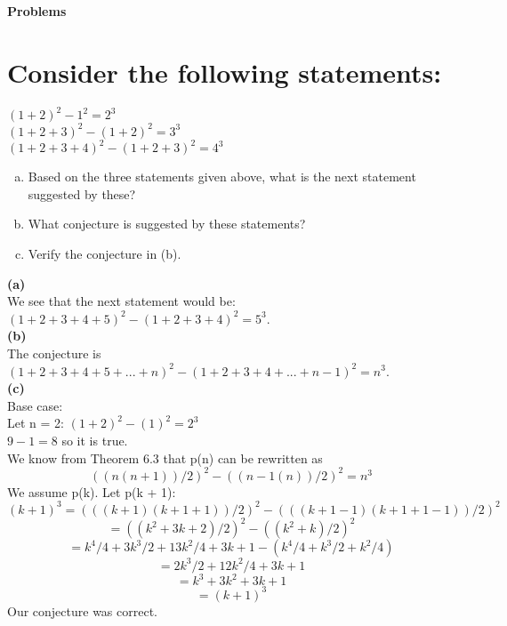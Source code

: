 \textbf{\Huge Problems}
\section{Consider the following statements:}
$(1+2)^2-1^2=2^3$\\
$(1+2+3)^2-(1+2)^2=3^3$\\
$(1+2+3+4)^2-(1+2+3)^2=4^3$\\
\begin{enumerate}[(a)]
\item Based on the three statements given above, what is the next statement suggested by these?
\item What conjecture is suggested by these statements?
\item Verify the conjecture in (b).
\end{enumerate}
\textbf{\Large(a)}\\
We see that the next statement would be: $(1+2+3+4+5)^2-(1+2+3+4)^2=5^3$.\\
\textbf{\Large(b)}\\
The conjecture is $(1+2+3+4+5+...+n)^2-(1+2+3+4+...+n-1)^2=n^3$.\\
\textbf{\Large(c)}\\
Base case:\\
Let n = 2: $(1+2)^2-(1)^2 = 2^3$\\
$9-1 = 8$ so it is true.\\
We know from Theorem 6.3 that p(n) can be rewritten as
\begin{equation}
((n(n+1))/2)^2 - ((n-1(n))/2)^2 = n^3
\end{equation}
We assume p(k).
Let p(k + 1):\\
\begin{equation}
(k+1)^3 = (((k+1)(k+1+1))/2)^2 - (((k+1-1)(k+1+1-1))/2)^2 
\end{equation}
\begin{equation}
 = ((k^2+3k+2)/2)^2 - ((k^2+k)/2)^2 
\end{equation}
\begin{equation}
 = k^4/4 + 3k^3/2 + 13k^2/4 + 3k + 1 - (k^4/4 + k^3/2 + k^2/4)
\end{equation}
\begin{equation}
 = 2k^3/2 + 12k^2/4 + 3k + 1
\end{equation}
\begin{equation}
 = k^3 + 3k^2 + 3k + 1
\end{equation}
\begin{equation}
 = (k+1)^3
\end{equation}
Our conjecture was correct.{\Huge\Bat}

